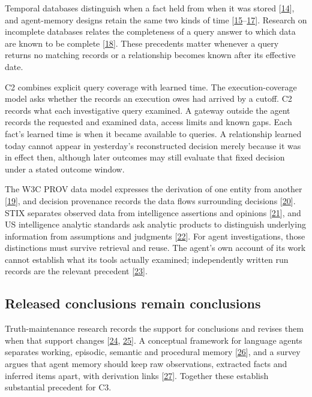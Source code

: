 \documentclass[acmlarge,nonacm]{acmart}
\begin{document}
Temporal databases distinguish when a fact held from when it was stored
{[}\protect\hyperlink{ref-Snodgrass1986Temporal}{14}{]}, and
agent-memory designs retain the same two kinds of time
{[}\protect\hyperlink{ref-Wang2026TOKI}{15}--\protect\hyperlink{ref-Dan2026Anamnesis}{17}{]}.
Research on incomplete databases relates the completeness of a query
answer to which data are known to be complete
{[}\protect\hyperlink{ref-Razniewski2011Completeness}{18}{]}. These
precedents matter whenever a query returns no matching records or a
relationship becomes known after its effective date.

C2 combines explicit query coverage with learned time. The
execution-coverage model asks whether the records an execution owes had
arrived by a cutoff. C2 records what each investigative query examined.
A gateway outside the agent records the requested and examined data,
access limits and known gaps. Each fact's learned time is when it became
available to queries. A relationship learned today cannot appear in
yesterday's reconstructed decision merely because it was in effect then,
although later outcomes may still evaluate that fixed decision under a
stated outcome window.

The W3C PROV data model expresses the derivation of one entity from
another {[}\protect\hyperlink{ref-W3C2013PROVDM}{19}{]}, and decision
provenance records the data flows surrounding decisions
{[}\protect\hyperlink{ref-Singh2019DecisionProvenance}{20}{]}. STIX
separates observed data from intelligence assertions and opinions
{[}\protect\hyperlink{ref-OASIS2021STIX}{21}{]}, and US intelligence
analytic standards ask analytic products to distinguish underlying
information from assumptions and judgments
{[}\protect\hyperlink{ref-ODNI2015ICD203}{22}{]}. For agent
investigations, those distinctions must survive retrieval and reuse. The
agent's own account of its work cannot establish what its tools actually
examined; independently written run records are the relevant precedent
{[}\protect\hyperlink{ref-Dai2026Hearsay}{23}{]}.

\hypertarget{released-conclusions-remain-conclusions}{%
\subsection{Released conclusions remain
conclusions}\label{released-conclusions-remain-conclusions}}

Truth-maintenance research records the support for conclusions and
revises them when that support changes
{[}\protect\hyperlink{ref-Doyle1979TMS}{24},
\protect\hyperlink{ref-Malheiro1994BeliefRevision}{25}{]}. A conceptual
framework for language agents separates working, episodic, semantic and
procedural memory {[}\protect\hyperlink{ref-Sumers2024CoALA}{26}{]}, and
a survey argues that agent memory should keep raw observations,
extracted facts and inferred items apart, with derivation links
{[}\protect\hyperlink{ref-Wang2026AgentTraces}{27}{]}. Together these
establish substantial precedent for C3.
\end{document}
